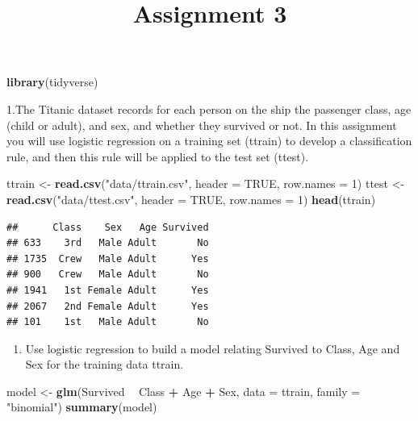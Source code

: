 \documentclass[]{article}
\title{Assignment 3}
\author{}
\date{}
\newenvironment{Shaded}{\begin{snugshade}}{\end{snugshade}}
\newcommand{\DataTypeTok}[1]{\textcolor[rgb]{0.13,0.29,0.53}{#1}}
\newcommand{\DecValTok}[1]{\textcolor[rgb]{0.00,0.00,0.81}{#1}}
\newcommand{\KeywordTok}[1]{\textcolor[rgb]{0.13,0.29,0.53}{\textbf{#1}}}
\newcommand{\NormalTok}[1]{#1}
\newcommand{\OperatorTok}[1]{\textcolor[rgb]{0.81,0.36,0.00}{\textbf{#1}}}
\newcommand{\OtherTok}[1]{\textcolor[rgb]{0.56,0.35,0.01}{#1}}
\newcommand{\StringTok}[1]{\textcolor[rgb]{0.31,0.60,0.02}{#1}}
\providecommand{\tightlist}{%
  \setlength{\itemsep}{0pt}\setlength{\parskip}{0pt}}
\begin{document}
\maketitle

\begin{Shaded}
\begin{Highlighting}[]
\KeywordTok{library}\NormalTok{(tidyverse)}
\end{Highlighting}
\end{Shaded}

1.The Titanic dataset records for each person on the ship the passenger
class, age (child or adult), and sex, and whether they survived or not.
In this assignment you will use logistic regression on a training set
(ttrain) to develop a classification rule, and then this rule will be
applied to the test set (ttest).

\begin{Shaded}
\begin{Highlighting}[]
\NormalTok{ttrain <-}\StringTok{ }\KeywordTok{read.csv}\NormalTok{(}\StringTok{"data/ttrain.csv"}\NormalTok{, }\DataTypeTok{header =} \OtherTok{TRUE}\NormalTok{, }\DataTypeTok{row.names =} \DecValTok{1}\NormalTok{)}
\NormalTok{ttest <-}\StringTok{ }\KeywordTok{read.csv}\NormalTok{(}\StringTok{"data/ttest.csv"}\NormalTok{, }\DataTypeTok{header =} \OtherTok{TRUE}\NormalTok{, }\DataTypeTok{row.names =} \DecValTok{1}\NormalTok{)}
\KeywordTok{head}\NormalTok{(ttrain)}
\end{Highlighting}
\end{Shaded}

\begin{verbatim}
##      Class    Sex   Age Survived
## 633    3rd   Male Adult       No
## 1735  Crew   Male Adult      Yes
## 900   Crew   Male Adult       No
## 1941   1st Female Adult      Yes
## 2067   2nd Female Adult      Yes
## 101    1st   Male Adult       No
\end{verbatim}

\begin{enumerate}
\def\labelenumi{(\alph{enumi})}
\tightlist
\item
  Use logistic regression to build a model relating Survived to Class,
  Age and Sex for the training data ttrain.
\end{enumerate}

\begin{Shaded}
\begin{Highlighting}[]
\NormalTok{model <-}\StringTok{ }\KeywordTok{glm}\NormalTok{(Survived }\OperatorTok{~}\StringTok{ }\NormalTok{Class }\OperatorTok{+}\StringTok{ }\NormalTok{Age }\OperatorTok{+}\StringTok{ }\NormalTok{Sex, }\DataTypeTok{data =}\NormalTok{ ttrain, }
             \DataTypeTok{family =} \StringTok{"binomial"}\NormalTok{)}
\KeywordTok{summary}\NormalTok{(model)}
\end{Highlighting}
\end{Shaded}
\end{document}
